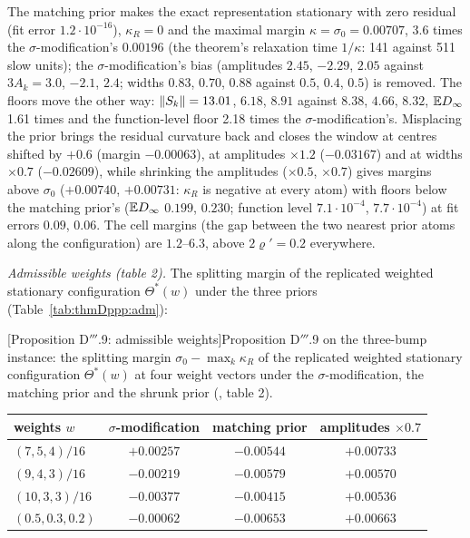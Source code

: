 The matching prior makes the exact representation stationary with zero residual (fit error $1.2\cdot10^{-16}$),
$\kappa_R = 0$ and the maximal margin $\kappa = \sigma_0 = 0.00707$, 3.6 times the $\sigma$-modification's
$0.00196$ (the theorem's relaxation time $1/\kappa$: 141 against 511 slow units); the $\sigma$-modification's bias
(amplitudes $2.45$, $-2.29$, $2.05$ against $3A_k = 3.0$, $-2.1$, $2.4$; widths $0.83$, $0.70$, $0.88$ against
$0.5$, $0.4$, $0.5$) is removed. The floors move the other way: $\lVert S_k\rVert = 13.01$, $6.18$, $8.91$ against
$8.38$, $4.66$, $8.32$, $\mathbb{E} D_\infty$ 1.61 times and the function-level floor 2.18 times the
$\sigma$-modification's. Misplacing the prior brings the residual curvature back and closes the window at centres
shifted by $+0.6$ (margin $-0.00063$), at amplitudes $\times1.2$ ($-0.03167$) and at widths $\times0.7$
($-0.02609$), while shrinking the amplitudes ($\times0.5$, $\times0.7$) gives margins above $\sigma_0$ ($+0.00740$,
$+0.00731$: $\kappa_R$ is negative at every atom) with floors below the matching prior's ($\mathbb{E} D_\infty$ $0.199$,
$0.230$; function level $7.1\cdot10^{-4}$, $7.7\cdot10^{-4}$) at fit errors $0.09$, $0.06$. The cell margins (the
gap between the two nearest prior atoms along the configuration) are $1.2$--$6.3$, above $2\varrho' = 0.2$
everywhere.

\smallskip
\noindent\emph{Admissible weights (table 2).} The splitting margin of the replicated weighted stationary
configuration $\Theta^*(w)$ under the three priors (Table~\ref{tab:thmDppp:adm}):

\medskip
\noindent\begin{minipage}{\textwidth}
\centering\footnotesize
{}[Proposition D$'''$.9: admissible weights]{Proposition D$'''$.9 on the three-bump instance: the
splitting margin $\sigma_0 - \max_k\kappa_R$ of the replicated weighted stationary configuration $\Theta^*(w)$ at
four weight vectors under the $\sigma$-modification, the matching prior and the shrunk prior
(, table 2).}
\label{tab:thmDppp:adm}
\begin{tabular}{@{}lccc@{}}
\toprule
weights $w$ & $\sigma$-modification & matching prior & amplitudes $\times0.7$\\
\midrule
$(7,5,4)/16$ & $+0.00257$ & $-0.00544$ & $+0.00733$\\
$(9,4,3)/16$ & $-0.00219$ & $-0.00579$ & $+0.00570$\\
$(10,3,3)/16$ & $-0.00377$ & $-0.00415$ & $+0.00536$\\
$(0.5,0.3,0.2)$ & $-0.00062$ & $-0.00653$ & $+0.00663$\\
\bottomrule
\end{tabular}
\end{minipage}
\medskip

